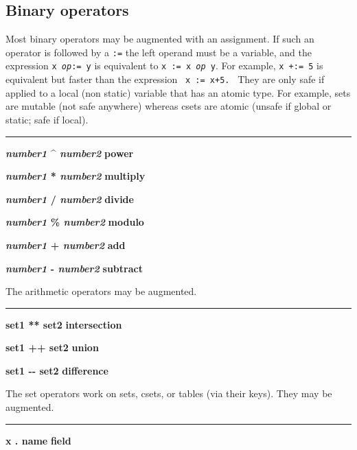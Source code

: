 \subsection*{Binary operators}

Most binary operators may be augmented with an
assignment. If such an operator is followed
by a \texttt{:=} the left operand must be a variable, and the
expression \texttt{x }\texttt{\textit{op}}\texttt{:= y} is equivalent
to \texttt{x := x }\texttt{\textit{op}}\texttt{ y}. For example,
\texttt{x +:= 5} is equivalent but faster than the expression
\ \texttt{x := x+5.}
 \
They are only safe if applied to a local (non static) variable that
has an atomic type. For example, sets are mutable (not safe anywhere)
whereas csets are atomic (unsafe if global or static; safe if local).

\bigskip\hrule\vspace{0.1cm}
\noindent
{\bf \textit{number1} \^{} \textit{number2} } \hfill {\bf power}
\index{power, exponent \^{}}

\noindent
{\bf \textit{number1} * \textit{number2} } \hfill {\bf multiply}

\noindent
{\bf \textit{number1} / \textit{number2} } \hfill {\bf divide}

\noindent
{\bf \textit{number1} \% \textit{number2} } \hfill {\bf modulo}

\noindent
{\bf \textit{number1} + \textit{number2} } \hfill {\bf add}

\noindent
{\bf \textit{number1} - \textit{number2} } \hfill {\bf subtract}

\noindent
The arithmetic operators may be augmented.

\bigskip\hrule\vspace{0.1cm}
\noindent
{\bf set1 ** set2 } \hfill {\bf intersection}

\noindent
{\bf set1 ++ set2 } \hfill {\bf union}

\noindent
{\bf set1 -{}- set2 } \hfill {\bf difference}

\noindent
The set operators work on sets, csets, or tables (via their keys).
They may be augmented.

\bigskip\hrule\vspace{0.1cm}

\noindent
{\bf x . name } \hfill {\bf field}

